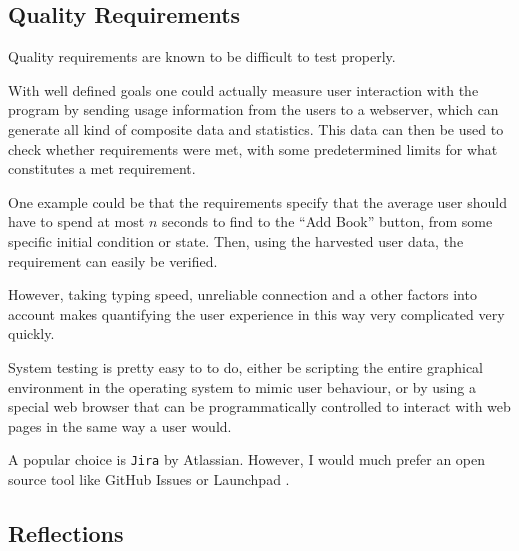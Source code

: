 \subsection{Quality Requirements}
Quality requirements are known to be difficult to test properly.


With well defined goals one could actually measure user interaction with the
program by sending usage information from the users to a webserver, which can
generate all kind of composite data and statistics. This data can then be used
to check whether requirements were met, with some predetermined limits for what
constitutes a met requirement.

One example could be that the requirements specify that the average user should
have to spend at most $n$ seconds to find to the ``Add Book'' button, from some
specific initial condition or state.
Then, using the harvested user data, the requirement can easily be verified.

However, taking typing speed, unreliable connection and a other factors into
account makes quantifying the user experience in this way very complicated very
quickly.


System testing is pretty easy to to do, either be scripting the entire
graphical environment in the operating system to mimic user behaviour, or by
using a special web browser that can be programmatically controlled to interact
with web pages in the same way a user would.


A popular choice is \texttt{Jira}\cite{tools:jira} by Atlassian. However, I would much
prefer an open source tool like GitHub Issues\cite{tools:github-issues} or
Launchpad \cite{tools:launchpad}.


\subsection{Reflections}\label{task-1c-reflect}




